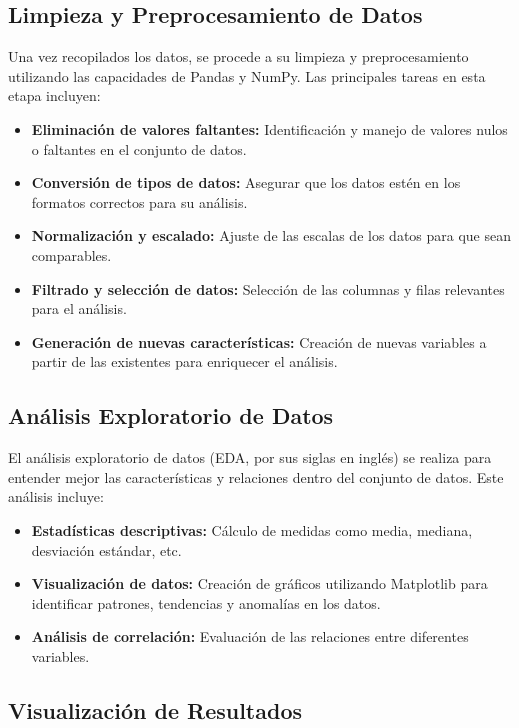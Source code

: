 \documentclass[conference]{IEEEtran}
\begin{document}
    \subsection{Limpieza y Preprocesamiento de Datos}
    
    Una vez recopilados los datos, se procede a su limpieza y preprocesamiento utilizando las capacidades de Pandas y NumPy. Las principales tareas en esta etapa incluyen:
    
    \begin{itemize}
        \item \textbf{Eliminación de valores faltantes:} Identificación y manejo de valores nulos o faltantes en el conjunto de datos.
        \item \textbf{Conversión de tipos de datos:} Asegurar que los datos estén en los formatos correctos para su análisis.
        \item \textbf{Normalización y escalado:} Ajuste de las escalas de los datos para que sean comparables.
        \item \textbf{Filtrado y selección de datos:} Selección de las columnas y filas relevantes para el análisis.
        \item \textbf{Generación de nuevas características:} Creación de nuevas variables a partir de las existentes para enriquecer el análisis.
    \end{itemize}
    
    \subsection{Análisis Exploratorio de Datos}
    El análisis exploratorio de datos (EDA, por sus siglas en inglés) se realiza para entender mejor las características y relaciones dentro del conjunto de datos. Este análisis incluye:
    
    \begin{itemize}
        \item \textbf{Estadísticas descriptivas:} Cálculo de medidas como media, mediana, desviación estándar, etc.
        \item \textbf{Visualización de datos:} Creación de gráficos utilizando Matplotlib para identificar patrones, tendencias y anomalías en los datos.
        \item \textbf{Análisis de correlación:} Evaluación de las relaciones entre diferentes variables.
    \end{itemize}
    
    \subsection{Visualización de Resultados}
    
\end{document}
